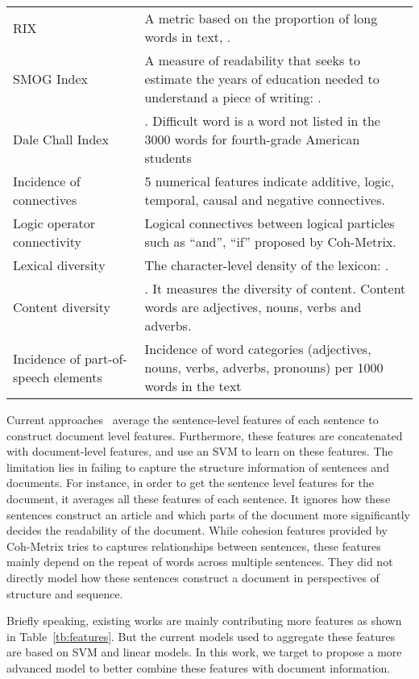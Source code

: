 \documentclass[runningheads]{llncs}
\begin{document}
\begin{table*}[!h]
\begin{tabular}{p{}|p{}}
		RIX~\cite{anderson1983lix} & A metric based on the proportion of long words in text, .\\
  		SMOG Index~\cite{mc1969smog} & A measure of readability that seeks to estimate the years of education needed to understand a piece of writing: .\\
  		Dale Chall Index~\cite{fry1968readability} & . Difficult word is a word not listed in the 3000 words for fourth-grade American students\\
  		Incidence of connectives~\cite{louwerse2001analytic} & 5 numerical features indicate additive, logic, temporal, causal and
negative connectives.\\
  		Logic operator connectivity~\cite{coxhead2000new} & Logical connectives between logical particles such as ``and'', ``if'' proposed by Coh-Metrix. \\
  		Lexical diversity & The character-level density of the lexicon: . \\
  		Content diversity &  . It measures the diversity of content. Content words are adjectives, nouns, verbs and adverbs.\\
  		Incidence of part-of-speech elements & Incidence of word categories (adjectives, nouns, verbs, adverbs, pronouns) per 1000 words
in the text \\
  	\end{tabular}
  	\caption{Explicit Features}\label{tb:features}
  	\vspace{-1cm}
  \end{table*}
Current approaches~\cite{SVM,collins2005predicting,pitler2008revisiting} average the sentence-level features of each sentence to construct document level features.
Furthermore, these features are concatenated with document-level features, and use an SVM to learn on these features. The limitation lies in failing to capture the structure information of sentences and documents. For instance, in order to get the sentence level features for the document, it averages all these features of each sentence. It ignores how these sentences construct an article and which parts of the document more significantly decides the readability of the document. While cohesion features provided by Coh-Metrix tries to captures relationships between sentences, these features mainly depend on the repeat of words across multiple sentences. They did not directly model how these sentences construct a document in perspectives of structure and sequence.

Briefly speaking, existing works are mainly contributing more features as shown in Table~\ref{tb:features}. But the current models used to aggregate these features are based on SVM and linear models. In this work, we target to propose a more advanced model to better combine these features with document information.
\end{document}
